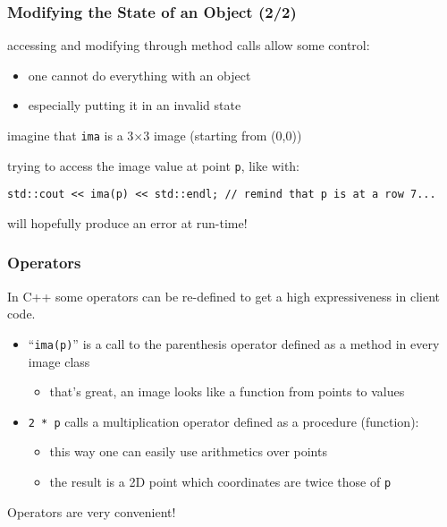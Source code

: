 \documentclass{beamer}
\newcommand{\cpp}{{C++}\xspace}
\newcommand{\code}[1]{{\scriptsize{\texttt{#1}}}\xspace}
\newcommand{\var}[1]{\texttt{#1}\xspace}
\begin{document}
\begin{frame}[fragile]
  \frametitle{Modifying the State of an Object (2/2)}

  accessing and modifying through method calls allow some control:
  \begin{itemize}
  \item one cannot do everything with an object
  \item especially putting it in an invalid state
  \end{itemize}

  \smallskip

imagine that \var{ima} is a 3$\times$3 image (starting from (0,0))

trying to access the image value at point \var{p}, like with:
\begin{lstlisting}
std::cout << ima(p) << std::endl; // remind that p is at a row 7...
\end{lstlisting} %
will hopefully produce an error at run-time!

\end{frame}



\begin{frame}
  \frametitle{Operators}

  In \cpp some operators can be re-defined to get a high
  expressiveness in client code.

  \begin{itemize}
  \item ``\code{ima(p)}'' is a call to the parenthesis operator
    defined as a method in every image class
    \begin{itemize}
    \item that's great, an image looks like a function from points to
      values
    \end{itemize}
    \smallskip
  \item \code{2 * p} calls a multiplication operator defined as a
    procedure (function):
    \begin{itemize}
    \item this way one can easily use arithmetics over points
    \item the result is a 2D point which coordinates are twice those of \var{p}
    \end{itemize}
  \end{itemize}

  Operators are very convenient!

\end{frame}
\end{document}

